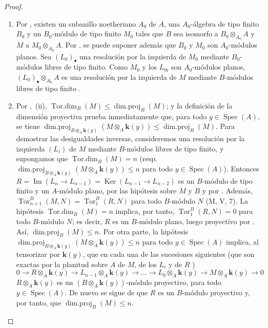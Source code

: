 \begin{proof}
\begin{enumerate}[label=(\roman*)]
  \item Por , existen un subanillo noetheriano $A_0$ de $A$, una $A_0$-álgebra de tipo finito $B_0$ y un $B_0$-módulo de tipo finito $M_0$ tales que $B$ sea isomorfo a $B_0\otimes_{A_0}A$ y $M$ a $M_0\otimes_{A_0}A$.
  Por , se puede suponer además que $B_0$ y $M_0$ son $A_0$-módulos planos.
  Sea $(L_0)_\bullet$ una resolución por la izquierda de $M_0$ mediante $B_0$-módulos libres de tipo finito.
  Como $M_0$ y los $L_{0i}$ son $A_0$-módulos planos, $(L_0)_\bullet\otimes_{A_0}A$ es una resolución por la izquierda de $M$ mediante $B$-módulos libres de tipo finito .

  \item Por ,~(ii),
  $\operatorname{Tor.dim}_B(M)\leq\operatorname{dim.proj}_B(M)$; y la definición de la dimensión proyectiva prueba inmediatamente que, para todo
$y\in\operatorname{Spec}(A)$, se tiene
$\operatorname{dim.proj}_{B\otimes_A\mathbf{k}(y)}(M\otimes_A\boldsymbol{k}(y))\leq\operatorname{dim.proj}_B(M)$.
  Para demostrar las desigualdades inversas, consideremos una resolución por la izquierda $(L_i)$ de $M$ mediante $B$-módulos libres de tipo finito, y supongamos que $\operatorname{Tor.dim}_B(M)=n$ (resp.\ $\operatorname{dim.proj}_{B\otimes_A\mathbf{k}(y)}(M\otimes_A\boldsymbol{k}(y))\leq n$ para todo $y\in\operatorname{Spec}(A)$).
  Entonces
  $R=\operatorname{Im}(L_n\to L_{n-1})=\operatorname{Ker}(L_{n-1}\to L_{n-2})$
  es un $B$-módulo de tipo finito y un $A$-módulo plano, por las hipótesis sobre $M$ y $B$ y por .
  Además,
  $\operatorname{Tor}^B_{n+1}(M,N)=\operatorname{Tor}^B_1(R,N)$
  para todo $B$-módulo $N$ (M, V, 7).
  La hipótesis $\operatorname{Tor.dim}_B(M)=n$ implica, por tanto, $\operatorname{Tor}^B_1(R,N)=0$ para todo $B$-módulo $N$; es decir, $R$ es un $B$-módulo plano, luego proyectivo por .
  Así, $\operatorname{dim.proj}_B(M)\leq n$.
  Por otra parte, la hipótesis $\operatorname{dim.proj}_{B\otimes_A\mathbf{k}(y)}(M\otimes_A\boldsymbol{k}(y))\leq n$ para todo $y\in\operatorname{Spec}(A)$ implica, al tensorizar por $\boldsymbol{k}(y)$, que en cada una de las sucesiones siguientes (que son exactas por la planitud sobre $A$ de $M$, de los $L_i$ y de $R$ )
  \[
    0\to R\otimes_A\boldsymbol{k}(y)\to L_{n-1}\otimes_A\boldsymbol{k}(y)\to\ldots
    \to L_0\otimes_A\boldsymbol{k}(y)\to M\otimes_A\boldsymbol{k}(y)\to0
  \]
  $R\otimes_A\boldsymbol{k}(y)$ es un $(B\otimes_A\boldsymbol{k}(y))$-módulo proyectivo, para todo $y\in\operatorname{Spec}(A)$.
  De nuevo se sigue de  que $R$ es un $B$-módulo proyectivo y, por tanto, que $\operatorname{dim.proj}_B(M)\leq n$.
\end{enumerate}
\end{proof}

